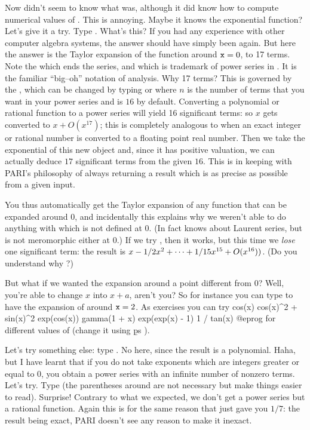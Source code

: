 \medskip
Now  didn't seem to know what  was, although it did know
how to compute numerical values of . This is annoying. Maybe it
knows the exponential function? Let's give it a try. Type .
What's this? If you had any experience with other computer algebra systems,
the answer should have simply been  again. But here the answer is
the Taylor expansion of the function around ${\tt x}=0$, to 17 terms. Note
the  which ends the series, and which is trademark of power
series in . It is the familiar ``big--oh'' notation of analysis.
Why 17 terms? This is governed by the , which
can be changed by typing  or  where $n$ is the number of terms that you want in your power series
and is $16$ by default. Converting a polynomial or rational function to a
power series will yield 16 significant terms: so $x$ gets converted to $x +
O(x^{17})$; this is completely analogous to  when an exact
integer or rational number is converted to a floating point real number.
Then we take the exponential of this new object and, since it has positive
valuation, we can actually deduce $17$ significant terms from the given $16$.
This is in keeping with PARI's philosophy of always returning a result which
is as precise as possible from a given input.

You thus automatically get the Taylor expansion of any function that can be
expanded around $0$, and incidentally this explains why we weren't able to do
anything with  which is not defined at $0$. (In fact 
knows about Laurent series, but  is not meromorphic either at
$0$.) If we try , then it works, but this time we \emph{lose}
one significant term: the result is $x - 1/2\*x^2 + \dots + 1/15\*x^{15} +
O(x^{16}))$. (Do you understand why ?)

But what if we wanted the expansion around a point different from 0? Well,
you're able to change $x$ into $x+a$, aren't you? So for instance you can
type  to have the expansion of  around ${\tt x}=2$. As
exercises you can try
\bprog
  cos(x)
  cos(x)^2 + sin(x)^2
  exp(cos(x))
  gamma(1 + x)
  exp(exp(x) - 1)
  1 / tan(x)
@eprog\noindent
for different values of  (change it using \b{ps}
).

Let's try something else: type . No  here, since
the result is a polynomial.  Haha, but I have learnt that if you do not take
exponents which are integers greater or equal to 0, you obtain a power series
with an infinite number of nonzero terms. Let's try.  Type
 (the parentheses around  are not necessary but
make things easier to read). Surprise! Contrary to what we expected, we don't
get a power series but a rational function. Again this is for the same reason
that  just gave you $1/7$: the result being exact, PARI doesn't see
any reason to make it inexact.

